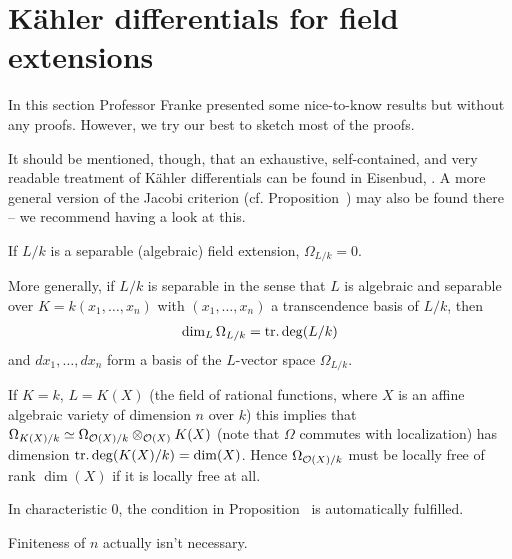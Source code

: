 \documentclass[a4paper,parskip=half,numbers=enddot, DIV=12, headheight=30pt]{scrreprt}
\begin{document}
\section{Kähler differentials for field extensions}
In this section Professor Franke presented some nice-to-know results but without any proofs. However, we try our best to sketch most of the proofs. 

It should be mentioned, though, that an exhaustive, self-contained, and very readable treatment of Kähler differentials can be found in Eisenbud, \cite[Chapter~16]{eisenbudCommAlg}. A more general version of the Jacobi criterion (cf. Proposition~) may also be found there -- we recommend having a look at this.

\begin{prop}
	\begin{alphanumerate}
		\item {}If $L/k$ is a separable (algebraic) field extension, $\Omega_{L/k} = 0$.
		\item More generally, if $L/k$ is separable in the sense that $L$ is algebraic and separable over $K=k(x_1,\ldots,x_n)$ with $(x_1,\ldots,x_n)$ a transcendence basis of $L/k$, then
		\begin{align*}
			\dim_L\Omega_{L/k}=\operatorname{tr.deg}(L/k)
		\end{align*}
		and $dx_1,\ldots,dx_n$ form a basis of the $L$-vector space $\Omega_{L/k}$.
	\end{alphanumerate}
\end{prop}
\begin{rem*}
	\begin{alphanumerate}
		\item If $K = k$, $L = K(X)$ (the field of rational functions, where $X$ is an affine algebraic variety of dimension $n$ over $k$) this implies that $\Omega_{K(X)/k} \simeq \Omega_{\mathcal{O}(X)/k} \otimes_{\mathcal{O}(X)} K(X) $ (note that $\Omega$ commutes with localization) has dimension $\operatorname{tr.deg}(K(X)/k) = \dim (X)$. Hence $\Omega_{\mathcal{O}(X)/k}$ must be locally free of rank $\dim(X)$ if it is locally free at all.
		\item In characteristic 0, the condition in Proposition~ is automatically fulfilled.
		\item Finiteness of $n$ actually isn't necessary.
	\end{alphanumerate}    
\end{rem*}
\end{document}
